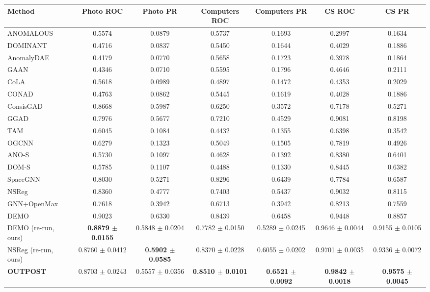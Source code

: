 \begin{table}[t]
\centering
\small
\begin{tabular}{lcccccc}
\toprule
Method & Photo ROC & Photo PR & Computers ROC & Computers PR & CS ROC & CS PR \\
\midrule
ANOMALOUS & 0.5574 & 0.0879 & 0.5737 & 0.1693 & 0.2997 & 0.1634 \\
DOMINANT & 0.4716 & 0.0837 & 0.5450 & 0.1644 & 0.4029 & 0.1886 \\
AnomalyDAE & 0.4179 & 0.0770 & 0.5658 & 0.1723 & 0.3978 & 0.1864 \\
GAAN & 0.4346 & 0.0710 & 0.5595 & 0.1796 & 0.4646 & 0.2111 \\
CoLA & 0.5618 & 0.0989 & 0.4897 & 0.1472 & 0.4353 & 0.2029 \\
CONAD & 0.4763 & 0.0862 & 0.5445 & 0.1619 & 0.4028 & 0.1886 \\
ConsisGAD & 0.8668 & 0.5987 & 0.6250 & 0.3572 & 0.7178 & 0.5271 \\
GGAD & 0.7976 & 0.5677 & 0.7210 & 0.4529 & 0.9081 & 0.8198 \\
TAM & 0.6045 & 0.1084 & 0.4432 & 0.1355 & 0.6398 & 0.3542 \\
OGCNN & 0.6279 & 0.1323 & 0.5049 & 0.1505 & 0.7819 & 0.4926 \\
ANO-S & 0.5730 & 0.1097 & 0.4628 & 0.1392 & 0.8380 & 0.6401 \\
DOM-S & 0.5785 & 0.1107 & 0.4488 & 0.1330 & 0.8445 & 0.6382 \\
SpaceGNN & 0.8030 & 0.5271 & 0.8296 & 0.6439 & 0.7784 & 0.6587 \\
NSReg & 0.8360 & 0.4777 & 0.7403 & 0.5437 & 0.9032 & 0.8115 \\
GNN+OpenMax & 0.7618 & 0.3942 & 0.6713 & 0.3942 & 0.8213 & 0.7559 \\
DEMO & 0.9023 & 0.6330 & 0.8439 & 0.6458 & 0.9448 & 0.8857 \\
DEMO (re-run, ours) & \textbf{0.8879 $\pm$ 0.0155} & 0.5848 $\pm$ 0.0204 & 0.7782 $\pm$ 0.0150 & 0.5289 $\pm$ 0.0245 & 0.9646 $\pm$ 0.0044 & 0.9155 $\pm$ 0.0105 \\
NSReg (re-run, ours) & 0.8760 $\pm$ 0.0412 & \textbf{0.5902 $\pm$ 0.0585} & 0.8370 $\pm$ 0.0228 & 0.6055 $\pm$ 0.0202 & 0.9701 $\pm$ 0.0035 & 0.9336 $\pm$ 0.0072 \\
\midrule
\textbf{OUTPOST} & 0.8703 $\pm$ 0.0243 & 0.5557 $\pm$ 0.0356 & \textbf{0.8510 $\pm$ 0.0101} & \textbf{0.6521 $\pm$ 0.0092} & \textbf{0.9842 $\pm$ 0.0018} & \textbf{0.9575 $\pm$ 0.0045} \\
\bottomrule

\end{tabular}
\end{table}
